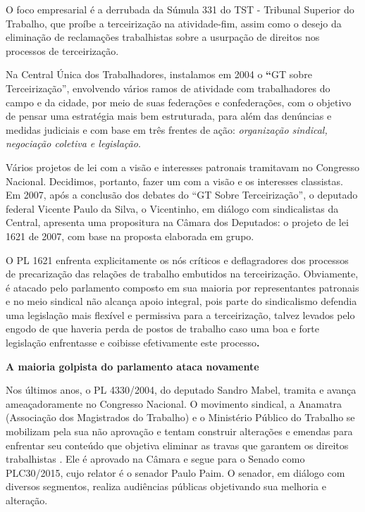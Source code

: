 O foco empresarial é a derrubada da Súmula 331 do TST - Tribunal
Superior do Trabalho, que proíbe a terceirização na atividade-fim, assim
como o desejo da eliminação de reclamações trabalhistas sobre a
usurpação de direitos nos processos de terceirização.

Na Central Única dos Trabalhadores, instalamos em 2004 o \textbf{``}GT
sobre Terceirização'', envolvendo vários ramos de atividade com
trabalhadores do campo e da cidade, por meio de suas federações e
confederações, com o objetivo de pensar uma estratégia mais bem
estruturada, para além das denúncias e medidas judiciais e com base em
três frentes de ação: \emph{organização sindical, negociação coletiva e
legislação}.

Vários projetos de lei com a visão e interesses patronais tramitavam no
Congresso Nacional. Decidimos, portanto, fazer um com a visão e os
interesses classistas. Em 2007, após a conclusão dos debates do ``GT
Sobre Terceirização'', o deputado federal Vicente Paulo da Silva, o
Vicentinho, em diálogo com sindicalistas da Central, apresenta uma
propositura na Câmara dos Deputados: o projeto de lei 1621 de 2007, com
base na proposta elaborada em grupo.

O PL 1621 enfrenta explicitamente os nós críticos e deflagradores dos
processos de precarização das relações de trabalho embutidos na
terceirização. Obviamente, é atacado pelo parlamento composto em sua
maioria por representantes patronais e no meio sindical não alcança
apoio integral, pois parte do sindicalismo defendia uma legislação mais
flexível e permissiva para a terceirização, talvez levados pelo engodo
de que haveria perda de postos de trabalho caso uma boa e forte
legislação enfrentasse e coibisse efetivamente este processo\textbf{.}

\textbf{A maioria golpista do parlamento ataca novamente}

Nos últimos anos, o PL 4330/2004, do deputado Sandro Mabel, tramita e
avança ameaçadoramente no Congresso Nacional. O movimento sindical, a
Anamatra (Associação dos Magistrados do Trabalho) e o Ministério Público
do Trabalho se mobilizam pela sua não aprovação e tentam construir
alterações e emendas para enfrentar seu conteúdo que objetiva eliminar
as travas que garantem os direitos trabalhistas . Ele é aprovado na
Câmara e segue para o Senado como PLC30/2015, cujo relator é o senador
Paulo Paim. O senador, em diálogo com diversos segmentos, realiza
audiências públicas objetivando sua melhoria e alteração.

